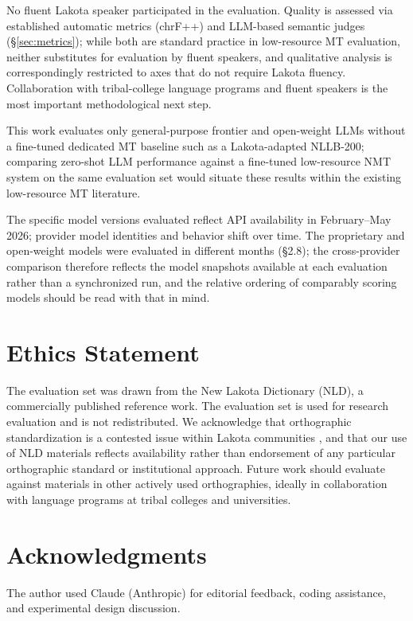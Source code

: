 \documentclass[11pt]{article}
\begin{document}
No fluent Lakota speaker participated in the evaluation. Quality is assessed via established automatic metrics (chrF++) and LLM-based semantic judges (\S\ref{sec:metrics}); while both are standard practice in low-resource MT evaluation, neither substitutes for evaluation by fluent speakers, and qualitative analysis is correspondingly restricted to axes that do not require Lakota fluency. Collaboration with tribal-college language programs and fluent speakers is the most important methodological next step.

This work evaluates only general-purpose frontier and open-weight LLMs without a fine-tuned dedicated MT baseline such as a Lakota-adapted NLLB-200; comparing zero-shot LLM performance against a fine-tuned low-resource NMT system on the same evaluation set would situate these results within the existing low-resource MT literature.

The specific model versions evaluated reflect API availability in February--May 2026; provider model identities and behavior shift over time. The proprietary and open-weight models were evaluated in different months (\S2.8); the cross-provider comparison therefore reflects the model snapshots available at each evaluation rather than a synchronized run, and the relative ordering of comparably scoring models should be read with that in mind.

\section*{Ethics Statement}

The evaluation set was drawn from the New Lakota Dictionary (NLD), a commercially published reference work. The evaluation set is used for research evaluation and is not redistributed. We acknowledge that orthographic standardization is a contested issue within Lakota communities \cite{hauff}, and that our use of NLD materials reflects availability rather than endorsement of any particular orthographic standard or institutional approach. Future work should evaluate against materials in other actively used orthographies, ideally in collaboration with language programs at tribal colleges and universities.

\section*{Acknowledgments}

The author used Claude (Anthropic) for editorial feedback, coding assistance, and experimental design discussion.
\end{document}
